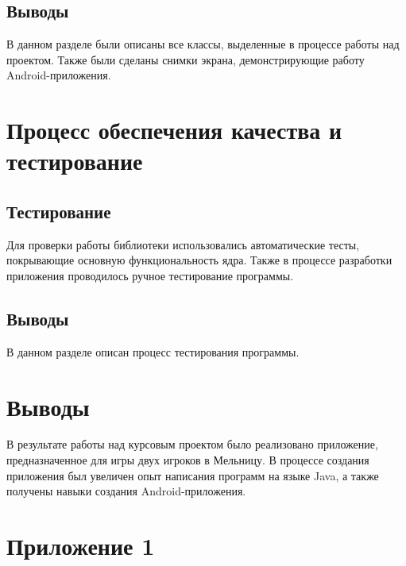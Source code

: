 \documentclass[a4paper]{article}
\begin{document}
\subsection{Выводы}

В данном разделе были описаны все классы, выделенные в процессе работы над проектом. Также были сделаны снимки экрана, демонстрирующие работу Android-приложения.

\section{Процесс обеспечения качества и тестирование}

\subsection{Тестирование}

Для проверки работы библиотеки использовались автоматические тесты, покрывающие основную функциональность ядра. Также в процессе разработки приложения проводилось ручное тестирование программы.

\subsection{Выводы}

В данном разделе описан процесс тестирования программы. 

\section{Выводы}

В результате работы над курсовым проектом было реализовано приложение, предназначенное для игры двух игроков в Мельницу. В процессе создания приложения был увеличен опыт написания программ на языке Java, а также получены навыки создания Android-приложения.   

\section{Приложение 1}


\parindent=1cm


\parindent=1cm


\parindent=1cm
\end{document}
